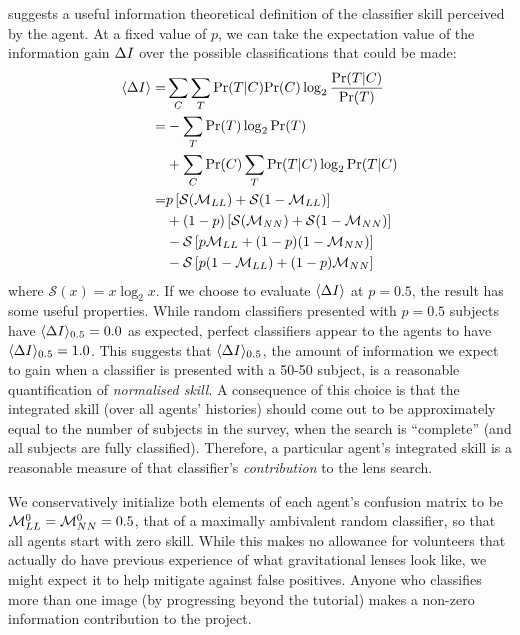 \documentclass[useAMS,usenatbib,a4paper]{mn2e}
\begin{document}
 suggests a useful information theoretical
definition of the classifier skill  perceived by the agent. At a fixed
value of $p$, we can take the expectation value of the information gain
$\Delta I$ over  the possible classifications that could be made:
\begin{align}
\langle\Delta I\rangle   =& \sum_C \sum_T {\rm Pr}(T|C) {\rm Pr}(C) \log_2 \frac{{\rm Pr}(T|C)}{{\rm Pr}(T)} \notag \\
         =& - \sum_T {\rm Pr}(T) \log_2 {\rm Pr}(T) \notag \\
          & + \sum_C {\rm Pr}(C) \sum_T {\rm Pr}(T|C) \log_2 {\rm Pr}(T|C) \notag \\
         =&         p  \left[ \mathcal{S}(\mathcal{M}_{LL}) + \mathcal{S}(1-\mathcal{M}_{LL}) \right] \notag \\
          &     +(1-p) \left[ \mathcal{S}(\mathcal{M}_{NN}) + \mathcal{S}(1-\mathcal{M}_{NN}) \right] \notag \\
          & - \mathcal{S}\left[ p    \mathcal{M}_{LL}       + (1-p)(1-\mathcal{M}_{NN})     \right] \notag \\
          & - \mathcal{S}\left[ p (1-\mathcal{M}_{LL})      + (1-p)   \mathcal{M}_{NN}      \right]
\end{align}
where $\mathcal{S}(x) = x \log_2{x}$. If we choose to
evaluate $\langle\Delta I\rangle$ at $p = 0.5$, the result has some
useful properties. While random classifiers presented with  $p = 0.5$
subjects have ${\langle \Delta I \rangle_{0.5}} = 0.0$  as expected, perfect classifiers appear to
the agents to have  ${\langle \Delta I \rangle_{0.5}} = 1.0$. This suggests that  ${\langle \Delta I \rangle_{0.5}}$, the
amount of information we expect to  gain when a classifier is presented
with a 50-50 subject, is a reasonable quantification of
\emph{normalised skill}. A consequence of this choice is that the
integrated skill (over all agents' histories) should come out to be
approximately
equal to the number of subjects in the survey, when the search is
``complete'' (and all subjects are fully classified). Therefore, a
particular agent's integrated skill is a reasonable
measure of that classifier's
\emph{contribution} to the lens search.

We conservatively initialize both elements of each  agent's confusion
matrix to be $\mathcal{M}^0_{LL} = \mathcal{M}^0_{NN} = 0.5$, that of a maximally ambivalent  random classifier, so
that all agents start with zero skill. While  this makes no allowance
for volunteers that actually do have previous experience of what
gravitational lenses look like, we might expect it to help mitigate
against false positives. Anyone who classifies more than one image (by
progressing beyond the tutorial) makes a non-zero information
contribution to the project.
\end{document}

